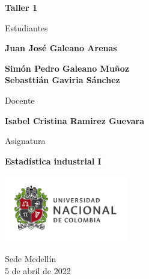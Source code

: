 \begin{titlepage}
   \Large{
   \begin{center}
       \vspace*{1cm}

       \textbf{Taller 1}

            
       \vspace{1.5cm}
       
       Estudiantes
       
       \vspace{0.5cm}
        
	\textbf{Juan José Galeano Arenas}        

       \textbf{Simón Pedro Galeano Muñoz} \\

	\textbf{Sebasttián Gaviria Sánchez}

              \vspace{1cm}
       
       Docente
       
       \vspace{0.5cm}

       \textbf{Isabel Cristina Ramirez Guevara}
       
       \vspace{0.4cm}

       \vspace{1.4cm}
       
       Asignatura
       
       \vspace{0.5cm}

       \textbf{Estadística industrial I}

       \vfill

            
       \vspace{0.4cm}
     
       \includegraphics[width=0.4\textwidth]{logounal.png}
            
       Sede Medellín\\
       5 de abril de 2022
       
   \end{center}
   }
\end{titlepage}